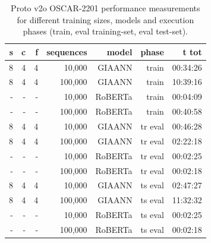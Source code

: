 \begin{table}[H]
\centering
\caption{Proto v2o OSCAR-2201 performance measurements for different training sizes, models and execution phases (train, eval training-set, eval test-set).}
\label{tab:protov2o-oscar-performance-models-inferenceLeakyIntegrateAndFire}
\begin{tabular}{rrrrrrr}
\toprule
\textbf{s} & \textbf{c} & \textbf{f} & \textbf{sequences} & \textbf{model} & \textbf{phase} & \textbf{t tot} \\
\midrule
8 & 4 & 4 & 10,000  & GIAANN  & train   & 00:34:26 \\
8 & 4 & 4 & 100,000 & GIAANN  & train   & 10:39:16 \\
- & - & - & 10,000  & RoBERTa & train   & 00:04:09 \\
- & - & - & 100,000 & RoBERTa & train   & 00:40:58 \\
8 & 4 & 4 & 10,000  & GIAANN  & tr eval & 00:46:28 \\
8 & 4 & 4 & 100,000 & GIAANN  & tr eval & 02:22:18 \\
- & - & - & 10,000  & RoBERTa & tr eval & 00:02:25 \\
- & - & - & 100,000 & RoBERTa & tr eval & 00:02:18 \\
8 & 4 & 4 & 10,000  & GIAANN  & ts eval & 02:47:27 \\
8 & 4 & 4 & 100,000 & GIAANN  & ts eval & 11:32:32 \\
- & - & - & 10,000  & RoBERTa & ts eval & 00:02:25 \\
- & - & - & 100,000 & RoBERTa & ts eval & 00:02:18 \\
\bottomrule
\end{tabular}
\end{table}

